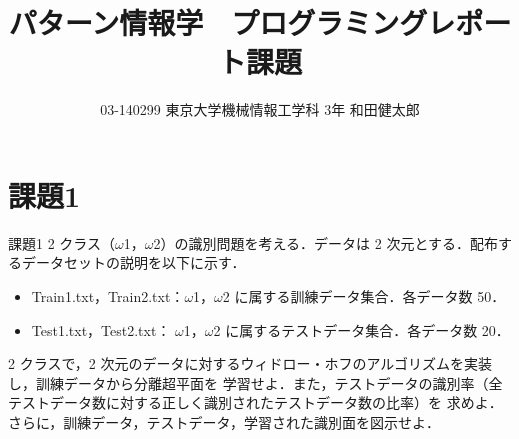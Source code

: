 \documentclass[10pt,a4paper,twocolumn]{jarticle}
\title{パターン情報学　プログラミングレポート課題}
\author{03-140299 東京大学機械情報工学科 3年 和田健太郎}
\begin{document}
\maketitle

\section{課題1}
\begin{itembox}[1]{課題1}
2 クラス（$\omega$1，$\omega$2）の識別問題を考える．データは 2 次元とする．配布するデータセットの説明を以下に示す．

\begin{itemize}
  \item Train1.txt，Train2.txt：$\omega$1，$\omega$2 に属する訓練データ集合．各データ数 50．
  \item Test1.txt，Test2.txt： $\omega$1，$\omega$2 に属するテストデータ集合．各データ数 20．
\end{itemize}

2 クラスで，2 次元のデータに対するウィドロー・ホフのアルゴリズムを実装し，訓練データから分離超平面を
学習せよ．また，テストデータの識別率（全テストデータ数に対する正しく識別されたテストデータ数の比率）を
求めよ．さらに，訓練データ，テストデータ，学習された識別面を図示せよ．
\end{itembox}



\end{document}
